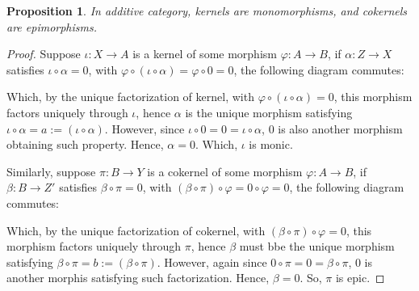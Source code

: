 \documentclass[x11names,reqno,12pt]{extarticle}
\newtheorem{prop}{Proposition}
\begin{document}
\begin{prop}
    In additive category, kernels are monomorphisms, and cokernels are epimorphisms.
\end{prop}
\begin{proof}
    Suppose $\iota:X\rightarrow A$ is a kernel of some morphism $\varphi:A\rightarrow B$, if $\alpha:Z\rightarrow X$ satisfies $\iota\circ \alpha=0$, with $\varphi\circ (\iota\circ\alpha) = \varphi\circ 0 = 0$, the following diagram commutes:
    \begin{center}
    \end{center}
    Which, by the unique factorization of kernel, with $\varphi\circ(\iota\circ \alpha) = 0$, this morphism factors uniquely through $\iota$, hence $\alpha$ is the unique morphism satisfying $\iota\circ \alpha = a:= (\iota\circ\alpha)$. However, since $\iota\circ 0 = 0 = \iota\circ\alpha$, $0$ is also another morphism obtaining such property. Hence, $\alpha=0$. Which, $\iota$ is monic.

    \hfill

    Similarly, suppose $\pi:B\rightarrow Y$ is a cokernel of some morphism $\varphi:A\rightarrow B$, if $\beta:B\rightarrow Z'$ satisfies $\beta\circ\pi = 0$, with $(\beta\circ\pi)\circ \varphi = 0\circ \varphi = 0$, the following diagram commutes:
    \begin{center}
    \end{center}
    Which, by the unique factorization of cokernel, with $(\beta\circ\pi)\circ\varphi = 0$, this morphism factors uniquely through $\pi$, hence $\beta$ must bbe the unique morphism satisfying $\beta\circ\pi = b:= (\beta\circ\pi)$. However, again since $0\circ\pi = 0 = \beta\circ\pi$, $0$ is another morphis satisfying such factorization. Hence, $\beta=0$. So, $\pi$ is epic.
\end{proof}
\end{document}
